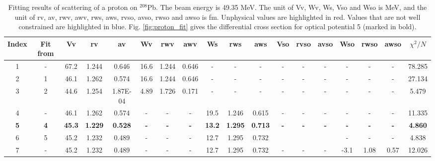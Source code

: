 \begin{landscape}
	\begin{table}[t]
		\centering
		\caption{Fitting results of scattering of a proton on $^{208}$Pb. The beam energy is 49.35 MeV. 
		The unit of Vv, Wv, Ws, Vso and Wso is MeV, and the unit of rv, av, rwv, awv, rws, aws, rvso, avso, rwso and awso is fm. 
	    Unphysical values are highlighted in red. Values that are not well constrained are highlighted in blue. 
        Fig. \ref{fig:proton_fit} gives the differential cross section for optical potential 5 (marked in bold). }
		\label{proton_table}
		\footnotesize
		\begin{tabular}{cccccccccccccccccc}
			\hline
			\hline
			Index & Fit from & Vv  & rv  & av  & Wv & rwv & awv  & Ws & rws & aws & Vso & rvso & avso & Wso & rwso & awso & $\chi^2/N$ \\
			\hline
			1     & -          & 67.2     & 1.244   & 0.646    & 16.6     & 1.244    & 0.646    & -        & -        & -        & -         & -         & -         & -         & -         & -        & 78.285   \\
			2     & 1          & 46.1     & 1.262   & 0.574    & 16.6     & 1.244    & 0.646    & -        & -        & -        & -         & -         & -         & -         & -         & -        & 27.134   \\
			3     & 2          & 44.6     & 1.254   & 1.87E-04 & 4.89     & 1.726    & 0.171    & -        & -        & -        & -         & -         & -         & -         & -         & -        & 5.479    \\
			4     & -          & 46.1     & 1.262   & 0.574    & -        & -        & -        & 19.5     & 1.246    & 0.615    & -         & -         & -         & -         & -         & -        & 11.335   \\
			\textbf{5}     & \textbf{4}          & \textbf{45.3}     & \textbf{1.229}   & \textbf{0.528}    & \textbf{-}        & \textbf{-}        & \textbf{-}        & \textbf{13.2}     & \textbf{1.295}    & \textbf{0.713}    & \textbf{-}         & \textbf{-}         & \textbf{-}         & \textbf{-}         & \textbf{-}         & \textbf{-}        & \textbf{4.860}    \\
			6     & 5          & 45.2     & 1.232   & 0.489    & -        & -        & -        & 12.7     & 1.295    & 0.732    & \color{blue}{0.14}     & \color{blue}{1.07}     & \color{blue}{0.55}     & -         & -         & -        & 4.838    \\
			7     & -          & 45.2     & 1.232   & 0.489    & -        & -        & -        & 12.7     & 1.295    & 0.732    & -         & -         & -         & -3.1    & 1.08      & 0.57     & 12.026   \\

\end{tabular}
\end{table}
\end{landscape}
